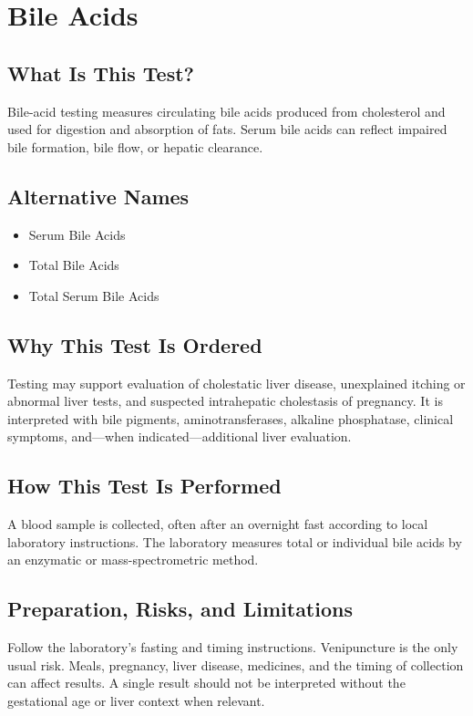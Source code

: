 \chapter{Bile Acids}

\section*{What Is This Test?}
Bile-acid testing measures circulating bile acids produced from cholesterol and used for digestion and absorption of fats. Serum bile acids can reflect impaired bile formation, bile flow, or hepatic clearance.

\section*{Alternative Names}
\begin{itemize}
  \item Serum Bile Acids
  \item Total Bile Acids
  \item Total Serum Bile Acids
\end{itemize}
\section*{Why This Test Is Ordered}
Testing may support evaluation of cholestatic liver disease, unexplained itching or abnormal liver tests, and suspected intrahepatic cholestasis of pregnancy. It is interpreted with bile pigments, aminotransferases, alkaline phosphatase, clinical symptoms, and---when indicated---additional liver evaluation.

\section*{How This Test Is Performed}
A blood sample is collected, often after an overnight fast according to local laboratory instructions. The laboratory measures total or individual bile acids by an enzymatic or mass-spectrometric method.

\section*{Preparation, Risks, and Limitations}
Follow the laboratory's fasting and timing instructions. Venipuncture is the only usual risk. Meals, pregnancy, liver disease, medicines, and the timing of collection can affect results. A single result should not be interpreted without the gestational age or liver context when relevant.


